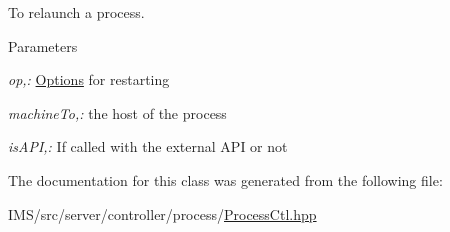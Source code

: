 To relaunch a process. 


\begin{DoxyParams}{Parameters}
\item[{\em op,:}]\hyperlink{classOptions}{Options} for restarting \item[{\em machineTo,:}]the host of the process \item[{\em isAPI,:}]If called with the external API or not \end{DoxyParams}


The documentation for this class was generated from the following file:\begin{DoxyCompactItemize}
\item 
IMS/src/server/controller/process/\hyperlink{ProcessCtl_8hpp}{ProcessCtl.hpp}\end{DoxyCompactItemize}
